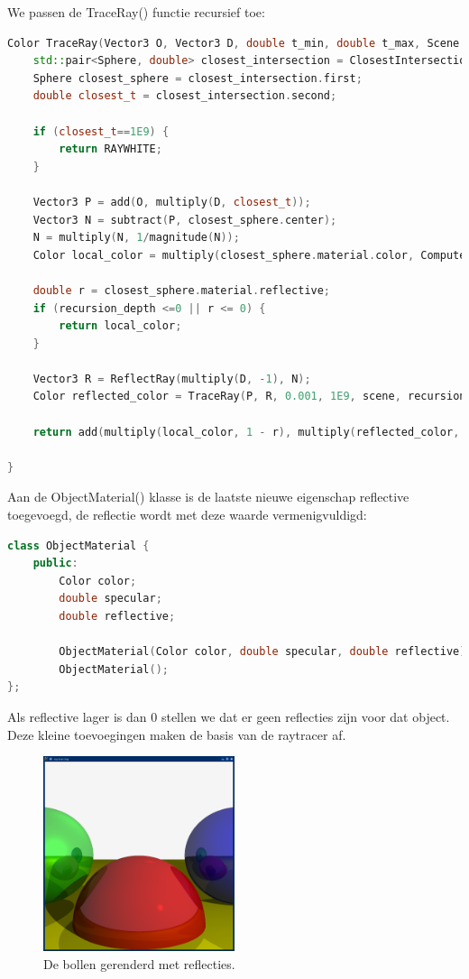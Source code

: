 \documentclass[12pt, a4paper]{article}
\begin{document}
We passen de TraceRay() functie recursief toe:
\begin{lstlisting}[language=C++]
Color TraceRay(Vector3 O, Vector3 D, double t_min, double t_max, Scene scene, int recursion_depth) {   
    std::pair<Sphere, double> closest_intersection = ClosestIntersection(O, D, t_min, t_max, scene);
    Sphere closest_sphere = closest_intersection.first;
    double closest_t = closest_intersection.second;

    if (closest_t==1E9) {
        return RAYWHITE;
    }

    Vector3 P = add(O, multiply(D, closest_t));
    Vector3 N = subtract(P, closest_sphere.center);
    N = multiply(N, 1/magnitude(N));
    Color local_color = multiply(closest_sphere.material.color, ComputeLighting(P, N, multiply(D, -1), closest_sphere.material.specular, scene));

    double r = closest_sphere.material.reflective;
    if (recursion_depth <=0 || r <= 0) {
        return local_color;
    }

    Vector3 R = ReflectRay(multiply(D, -1), N);
    Color reflected_color = TraceRay(P, R, 0.001, 1E9, scene, recursion_depth - 1);

    return add(multiply(local_color, 1 - r), multiply(reflected_color, r)); 

}
\end{lstlisting}

Aan de ObjectMaterial() klasse is de laatste nieuwe eigenschap reflective toegevoegd, de reflectie wordt met deze waarde vermenigvuldigd:

\begin{lstlisting}[language=C++]
class ObjectMaterial {
    public: 
        Color color;
        double specular;
        double reflective;

        ObjectMaterial(Color color, double specular, double reflective);
        ObjectMaterial();
};
\end{lstlisting}

Als reflective lager is dan 0 stellen we dat er geen reflecties zijn voor dat object. Deze kleine toevoegingen maken de basis van de raytracer af.

\begin{figure}[h]
    \centering
    \includegraphics[width=0.50\textwidth]{renders/reflection.png}
    \caption{De bollen gerenderd met reflecties.}
    \label{fig:reflection}
\end{figure}
\end{document}
